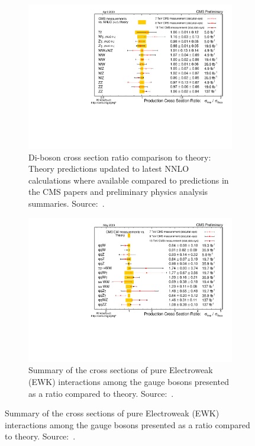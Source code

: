 \begin{figure}[htbp]
  \centering
  \begin{subfigure}[htbp]{0.48\textwidth}
    \centering
    \includegraphics[width=\textwidth]{figures_and_tables/theory/sm_vbf_results.pdf}
    \caption{ Di-boson cross section ratio comparison to theory: Theory predictions updated to latest NNLO calculations where available compared to predictions in the CMS papers and preliminary physics analysis summaries. Source:~\cite{cms_sm_xsec_summary}.}
  \label{sm_vbf_results}
  \end{subfigure}
  \hfill
  \begin{subfigure}[htbp]{0.48\textwidth}
    \centering
    \includegraphics[width=\textwidth]{figures_and_tables/theory/sm_ewk_results.pdf}
    \caption{ Summary of the cross sections of pure Electroweak (EWK) interactions among the gauge bosons presented as a ratio compared to theory. Source:~\cite{cms_sm_xsec_summary}.}
    \label{sm_ewk_results}
  \end{subfigure}
\end{figure}

